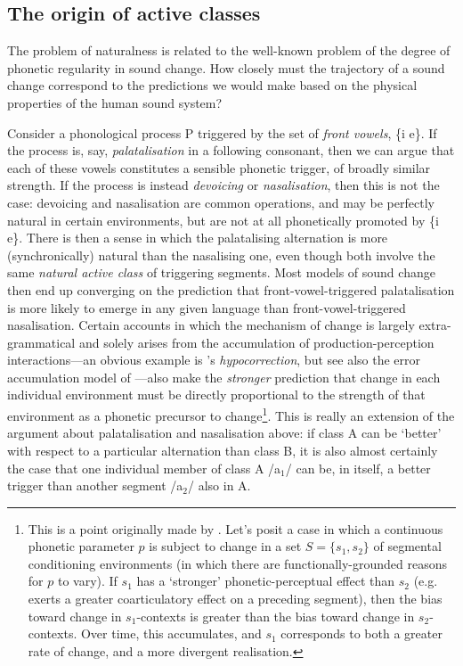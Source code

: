 \subsection{The origin of active classes}\label{s:tr_classtype}

The problem of naturalness is related to the well-known problem of the degree of phonetic regularity in sound change. How closely must the trajectory of a sound change correspond to the predictions we would make based on the physical properties of the human sound system?

Consider a phonological process P triggered by the set of \emph{front vowels}, \{i e\}. If the process is, say, \emph{palatalisation} in a following consonant, then we can argue that each of these vowels constitutes a sensible phonetic trigger, of broadly similar strength. If the process is instead \emph{devoicing} or \emph{nasalisation}, then this is not the case: devoicing and nasalisation are common operations, and may be perfectly natural in certain environments, but are not at all phonetically promoted by \{i e\}. There is then a sense in which the palatalising alternation is more (synchronically) natural than the nasalising one, even though both involve the same \emph{natural active class} of triggering segments. Most models of sound change then end up converging on the prediction that front-vowel-triggered palatalisation is more likely to emerge in any given language than front-vowel-triggered nasalisation. Certain accounts in which the mechanism of change is largely extra-grammatical and solely arises from the accumulation of production-perception interactions---an obvious example is \cite{Ohala1981}'s \emph{hypocorrection}, but see also the error accumulation model of \cite{Baker2011}---also make the \emph{stronger} prediction that change in each individual environment must be directly proportional to the strength of that environment as a phonetic precursor to change\footnote{This is a point originally made by \cite{Fruehwald2016}. Let's posit a case in which a continuous phonetic parameter $p$ is subject to change in a set $S=\{s_1,s_2\}$ of segmental conditioning environments (in which there are functionally-grounded reasons for $p$ to vary). If $s_1$ has a `stronger' phonetic-perceptual effect than $s_2$ (e.g. exerts a greater coarticulatory effect on a preceding segment), then the bias toward change in $s_1$-contexts is greater than the bias toward change in $s_2$-contexts. Over time, this accumulates, and $s_1$ corresponds to both a greater rate of change, and a more divergent realisation.}. This is really an extension of the argument about palatalisation and nasalisation above: if class A can be `better' with respect to a particular alternation than class B, it is also almost certainly the case that one individual member of class A /a$_1$/ can be, in itself, a better trigger than another segment /a$_2$/ also in A.

